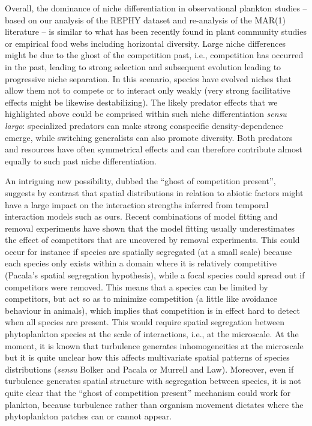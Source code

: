 \documentclass[9pt,twocolumn,twoside,lineno]{pnas-new}
\begin{document}
Overall, the dominance of niche differentiation in observational plankton
studies -- based on our analysis of the REPHY dataset and re-analysis
of the MAR(1) literature -- is similar to what has been recently
found in plant community studies\cite{volkov_patterns_2007,adler_competition_2018}
or empirical food webs including horizontal diversity\cite{barabas_self-regulation_2017}.
Large niche differences might be due to the ghost of the competition
past, i.e., competition has occurred in the past, leading to strong
selection and subsequent evolution leading to progressive niche separation.
In this scenario, species have evolved niches that allow them not
to compete or to interact only weakly (very strong facilitative effects
might be likewise destabilizing\cite{coyte_ecology_2015}). The
likely predator effects that we highlighted above could be comprised
within such niche differentiation \emph{sensu largo}: specialized
predators can make strong conspecific density-dependence emerge\cite{bagchi_pathogens_2014,comita_testing_2014},
while switching generalists can also promote diversity\cite{vallina2014maximal}.
Both predators and resources have often symmetrical effects and can
therefore contribute almost equally to such past niche differentiation\cite{chesson_updates_2018}.
\begin{flushleft}
An intriguing new possibility, dubbed the ``ghost of competition
present''\cite{tuck_strong_2018}, suggests by contrast that
spatial distributions in relation to abiotic factors might have a
large impact on the interaction strengths inferred from temporal interaction
models such as ours. Recent combinations of model fitting and removal
experiments have shown that the model fitting usually underestimates
the effect of competitors that are uncovered by removal experiments\cite{tuck_strong_2018,adler_weak_2018}.
This could occur for instance if species are spatially segregated
(at a small scale) because each species only exists within a domain
where it is relatively competitive (Pacala's spatial segregation hypothesis\cite{pacala1997biologically}),
while a focal species could spread out if competitors were removed.
This means that a species can be limited by competitors, but act so
as to minimize competition (a little like avoidance behaviour in animals),
which implies that competition is in effect hard to detect when all
species are present. This would require spatial segregation between
phytoplankton species at the scale of interactions, i.e., at the microscale.
At the moment, it is known that turbulence generates inhomogeneities
at the microscale\cite{barton_impact_2014,breier_emergence_2018}
but it is quite unclear how this affects multivariate spatial patterns
of species distributions (\textit{sensu} Bolker and Pacala\cite{bolker_spatial_1999}
or Murrell and Law\cite{murrell_heteromyopia_2003}). Moreover,
even if turbulence generates spatial structure with segregation between
species, it is not quite clear that the ``ghost of competition present''
mechanism could work for plankton, because turbulence rather than
organism movement dictates where the phytoplankton patches can or
cannot appear.
\par\end{flushleft}
\end{document}
